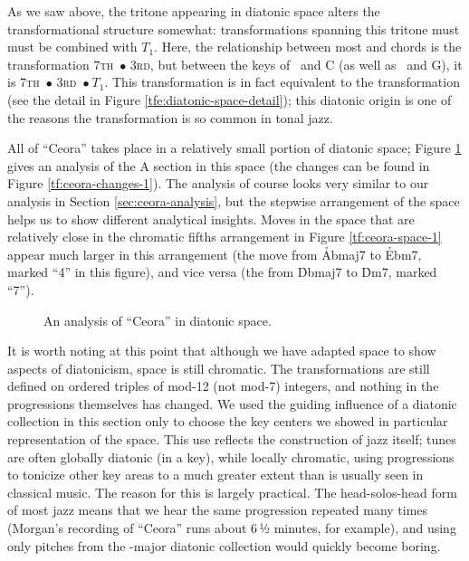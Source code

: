 As we saw above, the tritone appearing in diatonic space alters the
transformational structure somewhat: transformations spanning this tritone
must must be combined with $T_1$. Here, the relationship between most
\I and \ii chords is the transformation \textsc{7th}~$\bullet$
\textsc{3rd}, but between the keys of \Dflat\ and C (as well as \Aflat\ and
G), it is \textsc{7th}~$\bullet$ \textsc{3rd}~$\bullet\ T_1$. This transformation
is in fact equivalent to the transformation \slideS (see the detail in Figure
\ref{tfe:diatonic-space-detail}); this diatonic origin is one of the reasons
the \slideS transformation is so common in tonal jazz.


All of ``Ceora'' takes place in a relatively small portion of diatonic \tf
space; Figure \ref{tfe:ceora-space-diatonic} gives an analysis of the A
section in this space (the changes can be found in Figure
\ref{tf:ceora-changes-1}). The analysis of course looks very similar
to our analysis in Section \ref{sec:ceora-analysis}, but the stepwise
arrangement of the space helps us to show different analytical insights. Moves in
the space that are relatively close in the chromatic fifths arrangement in
Figure \ref{tf:ceora-space-1} appear much larger in this arrangement (the move
from \h{Abmaj7} to \h{Ebm7}, marked ``4'' in this figure), and vice versa (the
\slideS from \h{Dbmaj7} to \h{Dm7}, marked ``7'').

\begin{figure}[tbp]
  \caption{An analysis of ``Ceora'' in diatonic \tf space.}
  \label{tfe:ceora-space-diatonic}
\end{figure}

It is worth noting at this point that although we have adapted \tf space to
show aspects of diatonicism, \tf space is still chromatic. The transformations
are still defined on ordered triples of mod-12 (not mod-7) integers, and
nothing in the \tfo progressions themselves has changed. We used the guiding
influence of a diatonic collection in this section only to choose the key
centers we showed in particular representation of the space. This use reflects
the construction of jazz itself; tunes are often globally diatonic (in a key),
while locally chromatic, using \tfo progressions to tonicize other key areas
to a much greater extent than is usually seen in classical music. The reason
for this is largely practical. The head-solos-head form of most jazz means
that we hear the same progression repeated many times (Morgan's recording of
``Ceora'' runs about 6\,½ minutes, for example), and using only pitches from the
\Aflat-major diatonic collection would quickly become boring.


